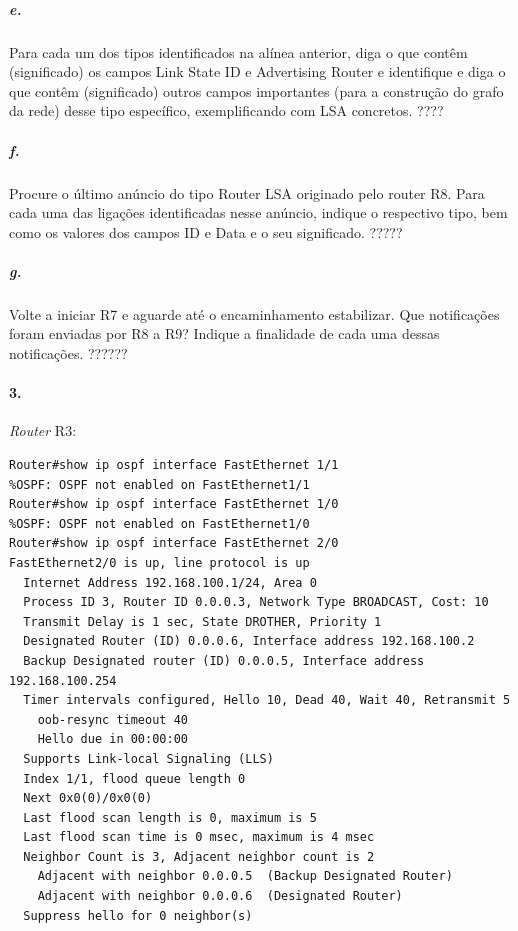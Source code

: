 \subparagraph{e.}
Para cada um dos tipos identificados na alínea anterior, diga o que contêm (significado) os campos Link State ID e Advertising Router e identifique e diga o que contêm (significado) outros campos importantes (para a construção do grafo da rede) desse tipo específico, exemplificando com LSA concretos.  ????

\subparagraph{f.}
Procure o último anúncio do tipo Router LSA originado pelo router R8. Para cada uma das ligações identificadas nesse anúncio, indique o respectivo tipo, bem como os valores dos campos ID e Data e o seu significado. ?????

\subparagraph{g.}
Volte a iniciar R7 e aguarde até o encaminhamento estabilizar. Que notificações foram enviadas por R8 a R9? Indique a finalidade de cada uma dessas notificações.
??????

\paragraph{3.}
\emph{Router} \textsf{R3}:
\begin{verbatim}
Router#show ip ospf interface FastEthernet 1/1
%OSPF: OSPF not enabled on FastEthernet1/1
Router#show ip ospf interface FastEthernet 1/0
%OSPF: OSPF not enabled on FastEthernet1/0
Router#show ip ospf interface FastEthernet 2/0
FastEthernet2/0 is up, line protocol is up 
  Internet Address 192.168.100.1/24, Area 0 
  Process ID 3, Router ID 0.0.0.3, Network Type BROADCAST, Cost: 10
  Transmit Delay is 1 sec, State DROTHER, Priority 1 
  Designated Router (ID) 0.0.0.6, Interface address 192.168.100.2
  Backup Designated router (ID) 0.0.0.5, Interface address 192.168.100.254
  Timer intervals configured, Hello 10, Dead 40, Wait 40, Retransmit 5
    oob-resync timeout 40
    Hello due in 00:00:00
  Supports Link-local Signaling (LLS)
  Index 1/1, flood queue length 0
  Next 0x0(0)/0x0(0)
  Last flood scan length is 0, maximum is 5
  Last flood scan time is 0 msec, maximum is 4 msec
  Neighbor Count is 3, Adjacent neighbor count is 2 
    Adjacent with neighbor 0.0.0.5  (Backup Designated Router)
    Adjacent with neighbor 0.0.0.6  (Designated Router)
  Suppress hello for 0 neighbor(s)
\end{verbatim}

